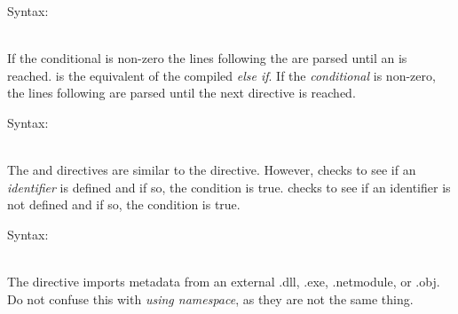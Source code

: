 Syntax:




~\\

If the conditional is non-zero the lines following the  are parsed until an  is reached.  is the equivalent of the compiled \textit{else if}. If the \textit{conditional} is non-zero, the lines following are parsed until the next directive is reached.


Syntax:



~\\

The  and  directives are similar to the  directive. However,  checks to see if an \textit{identifier} is defined and if so, the condition is true.  checks to see if an identifier is not defined and if so, the condition is true.


Syntax:


~\\

The  directive imports metadata from an external .dll, .exe, .netmodule, or .obj. Do not confuse this with \textit{using namespace}, as they are not the same thing. 

~\\

\newpage


